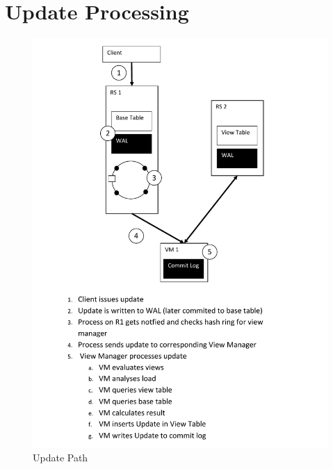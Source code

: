 \section{Update Processing}
\begin{figure}[h!]
  
  \centering
    \includegraphics[scale=0.7]{figures/SO_UpdateProcessing}
    \caption{Update Path}
    \label{fig:updatepath}
\end{figure}

\newpage

